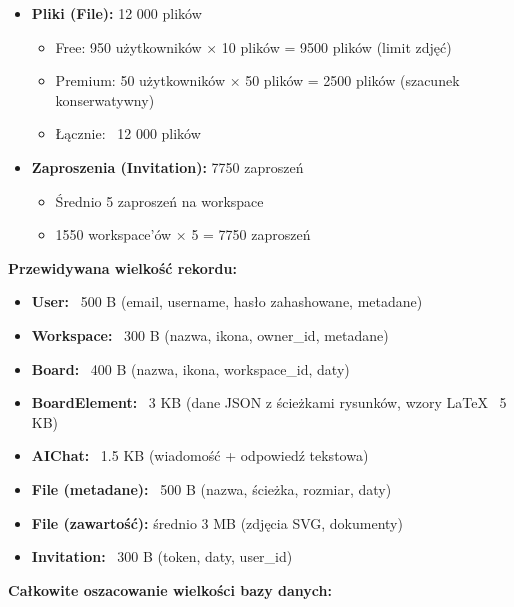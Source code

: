 \documentclass[12pt,a4paper]{article}
\begin{document}
\begin{itemize}[leftmargin=*]
    \item \textbf{Pliki (File):} 12 000 plików
    \begin{itemize}
        \item Free: 950 użytkowników × 10 plików = 9500 plików (limit zdjęć)
        \item Premium: 50 użytkowników × 50 plików = 2500 plików (szacunek konserwatywny)
        \item Łącznie: ~12 000 plików
    \end{itemize}
    
    \item \textbf{Zaproszenia (Invitation):} 7750 zaproszeń
    \begin{itemize}
        \item Średnio 5 zaproszeń na workspace
        \item 1550 workspace'ów × 5 = 7750 zaproszeń
    \end{itemize}
\end{itemize}

\textbf{Przewidywana wielkość rekordu:}

\begin{itemize}[leftmargin=*]
    \item \textbf{User:} ~500 B (email, username, hasło zahashowane, metadane)
    \item \textbf{Workspace:} ~300 B (nazwa, ikona, owner\_id, metadane)
    \item \textbf{Board:} ~400 B (nazwa, ikona, workspace\_id, daty)
    \item \textbf{BoardElement:} ~3 KB (dane JSON z ścieżkami rysunków, wzory LaTeX ~5 KB)
    \item \textbf{AIChat:} ~1.5 KB (wiadomość + odpowiedź tekstowa)
    \item \textbf{File (metadane):} ~500 B (nazwa, ścieżka, rozmiar, daty)
    \item \textbf{File (zawartość):} średnio 3 MB (zdjęcia SVG, dokumenty)
    \item \textbf{Invitation:} ~300 B (token, daty, user\_id)
\end{itemize}

\textbf{Całkowite oszacowanie wielkości bazy danych:}
\end{document}
